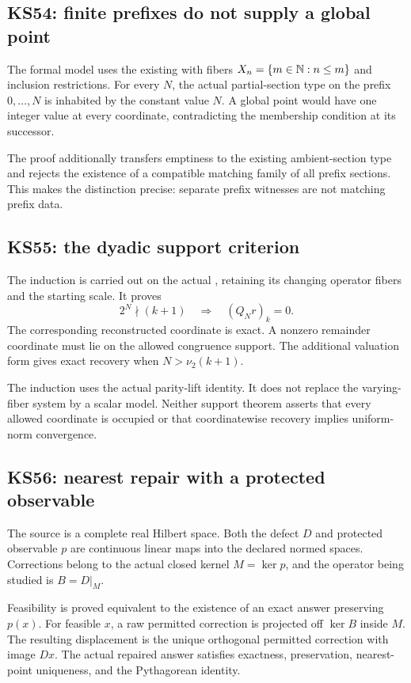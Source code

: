 \documentclass[11pt]{article}
\begin{document}
\subsection{KS54: finite prefixes do not supply a global point}
The formal model uses the existing  with fibers \(X_n=\{m\in\mathbb N:n\le m\}\) and inclusion restrictions. For every \(N\), the actual partial-section type on the prefix \(0,\ldots,N\) is inhabited by the constant value \(N\). A global point would have one integer value at every coordinate, contradicting the membership condition at its successor.

The proof additionally transfers emptiness to the existing ambient-section type and rejects the existence of a compatible matching family of all prefix sections. This makes the distinction precise: separate prefix witnesses are not matching prefix data.

\subsection{KS55: the dyadic support criterion}
The induction is carried out on the actual , retaining its changing operator fibers and the starting scale. It proves
\[
 2^N\nmid(k+1)\quad\Longrightarrow\quad (Q_Nr)_k=0.
\]
The corresponding reconstructed coordinate is exact. A nonzero remainder coordinate must lie on the allowed congruence support. The additional valuation form gives exact recovery when \(N>\nu_2(k+1)\).

The induction uses the actual parity-lift identity. It does not replace the varying-fiber system by a scalar model. Neither support theorem asserts that every allowed coordinate is occupied or that coordinatewise recovery implies uniform-norm convergence.

\subsection{KS56: nearest repair with a protected observable}
The source is a complete real Hilbert space. Both the defect \(D\) and protected observable \(p\) are continuous linear maps into the declared normed spaces. Corrections belong to the actual closed kernel \(M=\ker p\), and the operator being studied is \(B=D|_M\).

Feasibility is proved equivalent to the existence of an exact answer preserving \(p(x)\). For feasible \(x\), a raw permitted correction is projected off \(\ker B\) inside \(M\). The resulting displacement is the unique orthogonal permitted correction with image \(Dx\). The actual repaired answer satisfies exactness, preservation, nearest-point uniqueness, and the Pythagorean identity.
\end{document}
